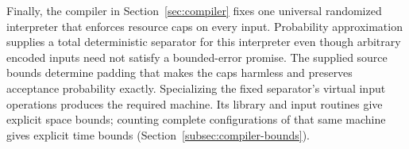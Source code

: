 Finally, the compiler in Section~\ref{sec:compiler} fixes one universal
randomized interpreter that enforces resource caps on every input.
Probability approximation supplies a total deterministic separator for
this interpreter even though arbitrary encoded inputs need not satisfy
a bounded-error promise. The supplied source bounds determine padding
that makes the caps harmless and preserves acceptance probability
exactly. Specializing the fixed separator's virtual input operations
produces the required machine. Its library and input routines give
explicit space bounds; counting complete configurations of that same
machine gives explicit time bounds (Section~\ref{subsec:compiler-bounds}).
